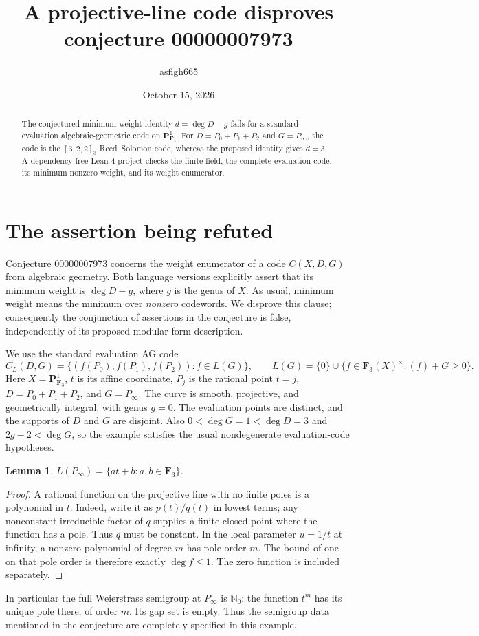 \documentclass[11pt,a4paper]{article}
\title{A projective-line code disproves conjecture 00000007973}
\author{asfigh665}
\date{October 15, 2026}
\newtheorem{lemma}{Lemma}
\begin{document}
\maketitle
\begin{abstract}
The conjectured minimum-weight identity $d=\deg D-g$ fails for a standard
evaluation algebraic-geometric code on $\mathbf P^1_{\mathbf F_3}$.
For $D=P_0+P_1+P_2$ and $G=P_\infty$, the code is the $[3,2,2]_3$
Reed--Solomon code, whereas the proposed identity gives $d=3$.
A dependency-free Lean 4 project checks the finite field, the complete
evaluation code, its minimum nonzero weight, and its weight enumerator.
\end{abstract}

\section{The assertion being refuted}
Conjecture 00000007973 concerns the weight enumerator of a code
$C(X,D,G)$ from algebraic geometry. Both language versions explicitly
assert that its minimum weight is $\deg D-g$, where $g$ is the genus of $X$.
As usual, minimum weight means the minimum over \emph{nonzero} codewords.
We disprove this clause; consequently the conjunction of assertions in the
conjecture is false, independently of its proposed modular-form description.

We use the standard evaluation AG code
\[
 C_L(D,G)=\{(f(P_0),f(P_1),f(P_2)):f\in L(G)\},
 \qquad L(G)=\{0\}\cup\{f\in\mathbf F_3(X)^\times:(f)+G\geq0\}.
\]
Here $X=\mathbf P^1_{\mathbf F_3}$, $t$ is its affine coordinate,
$P_j$ is the rational point $t=j$, $D=P_0+P_1+P_2$, and $G=P_\infty$.
The curve is smooth, projective, and geometrically integral, with genus
$g=0$. The evaluation points are distinct, and the supports of $D$ and
$G$ are disjoint. Also $0<\deg G=1<\deg D=3$ and $2g-2<\deg G$,
so the example satisfies the usual nondegenerate evaluation-code hypotheses.

\begin{lemma}
$L(P_\infty)=\{at+b:a,b\in\mathbf F_3\}$.
\end{lemma}
\begin{proof}
A rational function on the projective line with no finite poles is a
polynomial in $t$. Indeed, write it as $p(t)/q(t)$ in lowest terms; any
nonconstant irreducible factor of $q$ supplies a finite closed point where
the function has a pole. Thus $q$ must be constant. In the local parameter
$u=1/t$ at infinity, a nonzero polynomial of degree $m$ has pole order $m$.
The bound of one on that pole order is therefore exactly $\deg f\leq1$.
The zero function is included separately.
\end{proof}
In particular the full Weierstrass semigroup at $P_\infty$ is
$\mathbb N_0$: the function $t^m$ has its unique pole there, of order $m$.
Its gap set is empty. Thus the semigroup data mentioned in the conjecture
are completely specified in this example.
\end{document}
